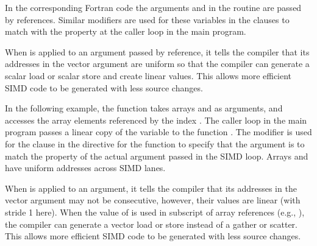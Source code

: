 In the corresponding Fortran code the arguments  and
 in the routine  are passed by references. 
Similar modifiers are used for these variables in the  clauses
to match with the property at the caller loop in the main program.

When  is applied to an argument passed by reference, it 
tells the compiler that its addresses in the vector argument are uniform 
so that the compiler can generate a scalar load or scalar store and create 
linear values. This allows more efficient SIMD code to be generated with 
less source changes.


In the following example, the function  takes arrays  and  
as arguments, and accesses the array elements referenced by the index .
The caller loop  in the main program passes a linear copy of
the variable  to the function .
The  modifier is used for the  clause 
in the  directive for the function
 to specify that the argument  is to match the property of 
the actual argument  passed in the SIMD loop.
Arrays  and  have uniform addresses across SIMD lanes.

When  is applied to an argument, 
it tells the compiler that its addresses in the vector argument may not be 
consecutive, however, their values are linear (with stride 1 here). When the value of  is used 
in subscript of array references (e.g., ), the compiler can generate 
a vector load or store instead of a gather or scatter. This allows more 
efficient SIMD code to be generated with less source changes.



